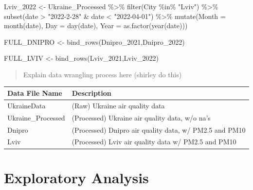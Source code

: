 \documentclass[
  12pt,
]{article}
\newenvironment{Shaded}{\begin{snugshade}}{\end{snugshade}}
\newcommand{\AttributeTok}[1]{\textcolor[rgb]{0.77,0.63,0.00}{#1}}
\newcommand{\FunctionTok}[1]{\textcolor[rgb]{0.00,0.00,0.00}{#1}}
\newcommand{\NormalTok}[1]{#1}
\newcommand{\OtherTok}[1]{\textcolor[rgb]{0.56,0.35,0.01}{#1}}
\newcommand{\SpecialCharTok}[1]{\textcolor[rgb]{0.00,0.00,0.00}{#1}}
\newcommand{\StringTok}[1]{\textcolor[rgb]{0.31,0.60,0.02}{#1}}
\begin{document}
\begin{Shaded}
\begin{Highlighting}[]
\NormalTok{Lviv\_2022 }\OtherTok{\textless{}{-}}\NormalTok{ Ukraine\_Processed }\SpecialCharTok{\%\textgreater{}\%} 
  \FunctionTok{filter}\NormalTok{(City }\SpecialCharTok{\%in\%} \StringTok{"Lviv"}\NormalTok{) }\SpecialCharTok{\%\textgreater{}\%}
  \FunctionTok{subset}\NormalTok{(date }\SpecialCharTok{\textgreater{}} \StringTok{"2022{-}2{-}28"} \SpecialCharTok{\&}\NormalTok{ date }\SpecialCharTok{\textless{}} \StringTok{"2022{-}04{-}01"}\NormalTok{) }\SpecialCharTok{\%\textgreater{}\%}
  \FunctionTok{mutate}\NormalTok{(}\AttributeTok{Month =} \FunctionTok{month}\NormalTok{(date), }
         \AttributeTok{Day =} \FunctionTok{day}\NormalTok{(date), }
          \AttributeTok{Year =} \FunctionTok{as.factor}\NormalTok{(}\FunctionTok{year}\NormalTok{(date)))}

\NormalTok{FULL\_DNIPRO }\OtherTok{\textless{}{-}} \FunctionTok{bind\_rows}\NormalTok{(Dnipro\_2021,Dnipro\_2022)}

\NormalTok{FULL\_LVIV }\OtherTok{\textless{}{-}} \FunctionTok{bind\_rows}\NormalTok{(Lviv\_2021,Lviv\_2022)}
\end{Highlighting}
\end{Shaded}

\begin{quote}
Explain data wrangling process here (shirley do this)
\end{quote}

\begin{longtable}[]{@{}ll@{}}
\toprule
Data File Name & Description \\
\midrule
\endhead
UkraineData & (Raw) Ukraine air quality data \\
Ukraine\_Processed & (Processed) Ukraine air quality data, w/o na's \\
Dnipro & (Processed) Dnipro air quality data, w/ PM2.5 and PM10 \\
Lviv & (Processed) Lviv air quality data w/ PM2.5 and PM10 \\
\bottomrule
\end{longtable}

\newpage

\hypertarget{exploratory-analysis}{%
\section{Exploratory Analysis}\label{exploratory-analysis}}
\end{document}
